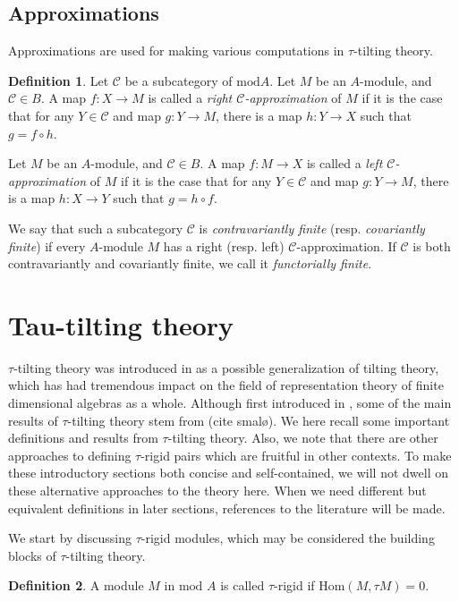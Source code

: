 \documentclass[]{article}
\theoremstyle{definition}
\newtheorem{definition}{Definition}[section]
\newcommand{\mo}{\ensuremath{\text{mod }}}
\newcommand{\Hom}{\ensuremath{\text{Hom}}}
\newcommand{\tu}{\ensuremath{\tau}}
\begin{document}
\subsection{Approximations}
Approximations are used for making various computations in \tu-tilting theory.
\begin{definition}
	Let $\mathcal{C}$ be a subcategory of $\text{mod} A$.  Let $M$ be an $A$-module, and $\mathcal{C} \in B$. A map $f:X \to M$ is called a \textit{right $\mathcal{C}$-approximation} of $M$ if it is the case that for any $Y \in \mathcal{C}$ and map $g:Y \to M$, there is a map $h:Y \to X$ such that $g = f \circ h$. 
	
	Let $M$ be an $A$-module, and $\mathcal{C} \in B$. A map $f:M \to X$ is called a \textit{left $\mathcal{C}$-approximation} of $M$ if it is the case that for any $Y \in \mathcal{C}$ and map $g:Y \to M$, there is a map $h:X \to Y$ such that $g = h \circ f$. 
\end{definition}

We say that such a subcategory $\mathcal{C}$ is \textit{contravariantly finite} (resp. \textit{covariantly finite}) if every $A$-module $M$ has a right (resp. left) $\mathcal{C}$-approximation. If $\mathcal{C}$ is both contravariantly and covariantly finite, we call it \textit{functorially finite}.


\section{Tau-tilting theory}
$\tau$-tilting theory was introduced in \cite{tau} as a possible generalization of tilting theory, which has had tremendous impact on the field of representation theory of finite dimensional algebras as a whole. Although first introduced in \cite{tau}, some of the main results of $\tau$-tilting theory stem from (cite smalø). We here recall some important definitions and results from $\tau$-tilting theory. Also, we note that there are other approaches to defining \tu-rigid pairs which are fruitful in other contexts. To make these introductory sections both concise and self-contained, we will not dwell on these alternative approaches to the theory here.  When we need different but equivalent definitions in later sections, references to the literature will be made.

We start by discussing $\tau$-rigid modules, which may be considered the building blocks of $\tau$-tilting theory. 


\begin{definition}
	A module $M$ in $\mo A$ is called $\tau$-rigid if $\Hom(M,\tau M) = 0$.
\end{definition}
\end{document}
